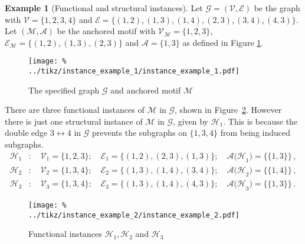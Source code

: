 \documentclass[12pt]{ociamthesis}
\theoremstyle{plain}
\theoremstyle{definition}
\newtheorem{example}{Example}[chapter]
\theoremstyle{remark}
\newcommand\ca[1]{\mathcal{#1}}
\begin{document}
\begin{example}[Functional and structural instances]
  \label{ex:instances}
  Let $\ca{G}=(\ca{V,E})$ be the graph with $\ca{V} = \{ 1,2,3,4 \}$ and
  $\ca{E} = \{ (1,2),(1,3),(1,4),(2,3),(3,4),(4,3) \}$. Let $(\ca{M,A})$ be the
  anchored motif with $\ca{V_M} = \{1,2,3\}$, $\ca{E_M} =
  \{(1,2),(1,3),(2,3)\}$ and $\ca{A} = \{1,3\}$ as defined in Figure
  \ref{fig:instance_example_1}.
  \begin{figure}[H]
    \centering
    \texttt{[image: \%
    ../tikz/instance\_example\_1/instance\_example\_1.pdf]}
    \caption{The specified graph $\ca{G}$ and anchored motif $\ca{M}$}
    \label{fig:instance_example_1}
  \end{figure}
  There are three functional instances of $\ca{M}$ in $\ca{G}$, shown in
  Figure~\ref{fig:instance_example_2}. However there is just one structural
  instance of $\ca{M}$ in $\ca{G}$, given by $\ca{H}_1$. This is because the
  double edge $3 \leftrightarrow 4$ in $\ca{G}$ prevents the subgraphs on
  $\{1,3,4\}$ from being induced subgraphs.
  \begin{align*}
    \ca{H}_1 &: \quad \ca{V}_1 = \{ 1,2,3 \} ; \quad \ca{E}_1 = \{ (1,2) ,
    (2,3) , (1,3) \} ; \quad \ca{A(H}_1) =  \big\{\{1,3\}\big\}\,, \\
    \ca{H}_2 &: \quad \ca{V}_2 = \{ 1,3,4 \} ; \quad \ca{E}_2 = \{ (1,3) ,
    (1,4) , (3,4) \} ; \quad \ca{A(H}_2) =  \big\{\{1,4\}\big\}\,, \\
    \ca{H}_3 &: \quad \ca{V}_3 = \{ 1,3,4 \} ; \quad \ca{E}_3 = \{ (1,3) ,
    (1,4) , (4,3) \} ; \quad \ca{A(H}_3) =  \big\{\{1,3\}\big\}\,.
  \end{align*}
  \begin{figure}[H]
    \centering
    \texttt{[image: \%
    ../tikz/instance\_example\_2/instance\_example\_2.pdf]}
    \caption{Functional instances $\ca{H}_1,\ca{H}_2$ and $\ca{H}_3$}
    \label{fig:instance_example_2}
  \end{figure}

\end{example}
\end{document}
